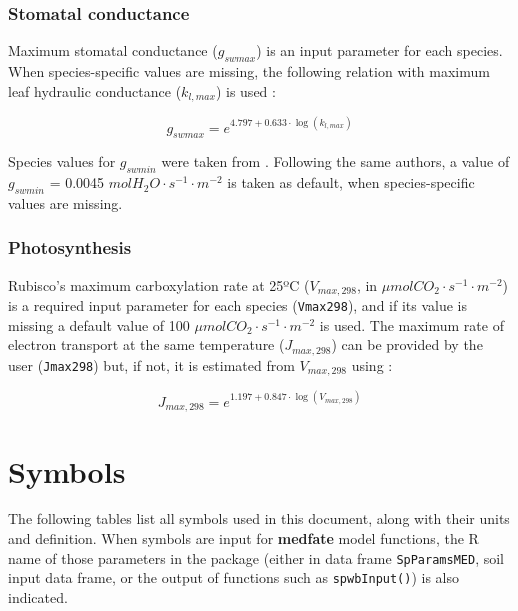 \documentclass[]{book}
\begin{document}
\subsection{Stomatal conductance}\label{stomatal-conductance}

Maximum stomatal conductance (\(g_{swmax}\)) is an input parameter for
each species. When species-specific values are missing, the following
relation with maximum leaf hydraulic conductance (\(k_{l, max}\)) is
used \citep{Mencuccini2003}:

\begin{equation}
g_{swmax} = e^{4.797 + 0.633\cdot \log(k_{l, max})}
\end{equation}

Species values for \(g_{swmin}\) were taken from \citet{Duursma2018}.
Following the same authors, a value of \(g_{swmin}\) = 0.0045
\(mol H_2O \cdot s^{-1} \cdot m^{-2}\) is taken as default, when
species-specific values are missing.

\subsection{Photosynthesis}\label{photosynthesis}

Rubisco's maximum carboxylation rate at 25ºC (\(V_{max, 298}\), in
\(\mu mol CO_2 \cdot s^{-1} \cdot m^{-2}\)) is a required input
parameter for each species (\texttt{Vmax298}), and if its value is
missing a default value of 100
\(\mu mol CO_2 \cdot s^{-1} \cdot m^{-2}\) is used. The maximum rate of
electron transport at the same temperature (\(J_{max, 298}\)) can be
provided by the user (\texttt{Jmax298}) but, if not, it is estimated
from \(V_{max, 298}\) using \citet{Walker2014}:

\begin{equation}
J_{max, 298} = e^{1.197 + 0.847\cdot \log(V_{max,298})}
\end{equation}

\chapter{Symbols}\label{symbols}

The following tables list all symbols used in this document, along with
their units and definition. When symbols are input for \textbf{medfate}
model functions, the R name of those parameters in the package (either
in data frame \texttt{SpParamsMED}, soil input data frame, or the output
of functions such as \texttt{spwbInput()}) is also indicated.
\end{document}
